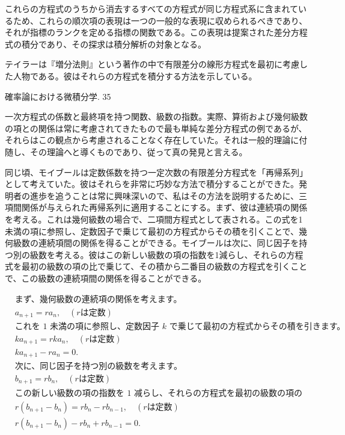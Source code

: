 \documentclass[a4paper,11pt,openany]{ltjsbook}
\begin{document}
これらの方程式のうちから消去するすべての方程式が同じ方程式系に含まれているため、これらの順次項の表現は一つの一般的な表現に収められるべきであり、それが指標のランクを定める指標の関数である。この表現は提案された差分方程式の積分であり、その探求は積分解析の対象となる。

テイラーは『増分法則』という著作の中で有限差分の線形方程式を最初に考慮した人物である。彼はそれらの方程式を積分する方法を示している。

確率論における微積分学. 35

一次方程式の係数と最終項を持つ関数、級数の指数。実際、算術および幾何級数の項との関係は常に考慮されてきたもので最も単純な差分方程式の例であるが、それらはこの観点から考慮されることなく存在していた。それは一般的理論に付随し、その理論へと導くものであり、従って真の発見と言える。

同じ頃、モイブールは定数係数を持つ一定次数の有限差分方程式を「再帰系列」として考えていた。彼はそれらを非常に巧妙な方法で積分することができた。発明者の進歩を追うことは常に興味深いので、私はその方法を説明するために、三項間関係が与えられた再帰系列に適用することにする。まず、彼は連続項の関係を考える。これは幾何級数の場合で、二項間方程式として表される。この式を1未満の項に参照し、定数因子で乗じて最初の方程式からその積を引くことで、幾何級数の連続項間の関係を得ることができる。モイブールは次に、同じ因子を持つ別の級数を考える。彼はこの新しい級数の項の指数を1減らし、それらの方程式を最初の級数の項の比で乗じて、その積から二番目の級数の方程式を引くことで、この級数の連続項間の関係を得ることができる。

$$
\begin{aligned}
& \text{まず、幾何級数の連続項の関係を考えます。} \\
& a_{n+1} = ra_n, \quad (r \text{は定数}) \\
& \text{これを 1 未満の項に参照し、定数因子 } k \text{ で乗じて最初の方程式からその積を引きます。} \\
& ka_{n+1} = rka_n, \quad (r \text{は定数}) \\
& ka_{n+1} - ra_n = 0. \\
& \text{次に、同じ因子を持つ別の級数を考えます。} \\
& b_{n+1} = rb_n, \quad (r \text{は定数}) \\
& \text{この新しい級数の項の指数を 1 减らし、それらの方程式を最初の級数の項の比で乗じて、その積から二番目の級数の方程式を引きます。} \\
& r(b_{n+1} - b_n) = rb_n - rb_{n-1}, \quad (r \text{は定数}) \\
& r(b_{n+1} - b_n) - rb_n + rb_{n-1} = 0. \\
\end{aligned}
$$
\end{document}
